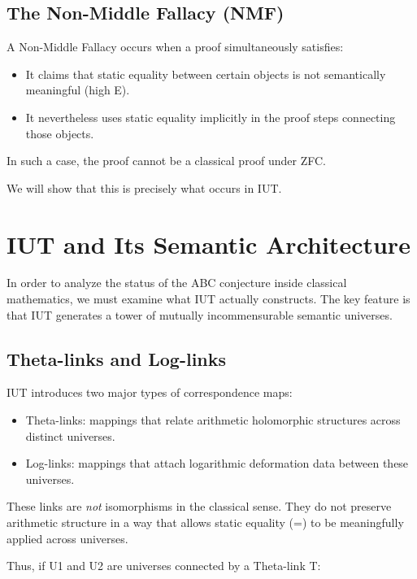 \documentclass[11pt]{article}
\begin{document}
\subsection{The Non-Middle Fallacy (NMF)}

A Non-Middle Fallacy occurs when a proof simultaneously satisfies:

\begin{itemize}
\item[(N1)] It claims that static equality between certain objects is not
semantically meaningful (high E).
\item[(N2)] It nevertheless uses static equality implicitly in the proof
steps connecting those objects.
\end{itemize}

In such a case, the proof cannot be a classical proof under ZFC.

We will show that this is precisely what occurs in IUT.


\section{IUT and Its Semantic Architecture}

In order to analyze the status of the ABC conjecture inside classical
mathematics, we must examine what IUT actually constructs. The key
feature is that IUT generates a tower of mutually incommensurable
semantic universes.

\subsection{Theta-links and Log-links}

IUT introduces two major types of correspondence maps:

\begin{itemize}
\item Theta-links: mappings that relate arithmetic holomorphic structures
across distinct universes.
\item Log-links: mappings that attach logarithmic deformation data between
these universes.
\end{itemize}

These links are \emph{not} isomorphisms in the classical sense.
They do not preserve arithmetic structure in a way that allows
static equality (=) to be meaningfully applied across universes.

Thus, if U1 and U2 are universes connected by a Theta-link T:
\end{document}
